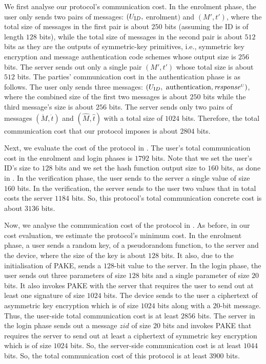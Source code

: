 We first analyse our protocol's communication cost. In the enrolment phase,  the user only sends two pairs of messages: $(U_{\text ID}, $ $\text{enrolment})$ and $(M', t')$, where the total size of messages in the first pair is about $250$ bits (assuming the ID is of length $128$ bits),  while the total size of messages in the second pair is about  $512$ bits as they are the outputs of symmetric-key primitives, i.e., symmetric key encryption and message authentication code schemes whose output size is $256$ bits. The server sends out only a single pair $(M', t')$ whose total size is about $512$ bits. 
% 
The parties' communication cost in the authentication phase is as follows. The user only sends three messages: $(U_{\text ID}, $ $\text{authentication}, \mathit{response}^{\scriptscriptstyle U})$, where the combined size of the first two messages is about $250$ bits while the third message's size is about $256$ bits. The server sends only two pairs of messages $(\ddot M, \ddot t)$ and $(\hat M, \hat t)$ with a total size of $1024$ bits. Therefore, the total communication cost that our protocol imposes is about $2804$ bits. 

Next, we evaluate the cost of the protocol in \cite{WangW18}. The user's total communication cost in the enrolment and login phases is $1792$ bits. Note that we set the user's ID's size to $128$ bits and we set the hash function output size to $160$ bits, as done in \cite{WangW18}. In the verification phase, the user sends to the server a single value of size $160$ bits. In the verification, the server sends to the user two values that in total costs the server $1184$ bits. So, this protocol's total communication concrete cost is about $3136$ bits.%


Now, we analyse the communication cost of the protocol in \cite{JareckiJKSS21}. As before, in our cost evaluation, we estimate the protocol's minimum cost.  In the enrolment phase, a user sends a random key, of a pseudorandom function, to the server and the device, where the size of the key is about $128$ bits. It also, due to the initialisation of PAKE, sends a $128$-bit value to the server. In the login phase, the user sends out three parameters of size $128$ bits and a single parameter of size $20$ bits.  It also invokes PAKE with the server that requires the user to send out at least one signature of size $1024$ bits. The device sends to the user a ciphertext of asymmetric key encryption which is of size $1024$ bits along with a $20$-bit message. Thus, the user-side total communication cost is at least $2856$ bits. The server in the login phase sends out a message $zid$ of size $20$ bits and invokes PAKE that requires the server to send out at least a ciphertext of symmetric key encryption which is of size $1024$ bits.  So, the server-side communication cost is at least $1044$ bits. So, the total communication cost of this protocol is at least $3900$ bits. 





